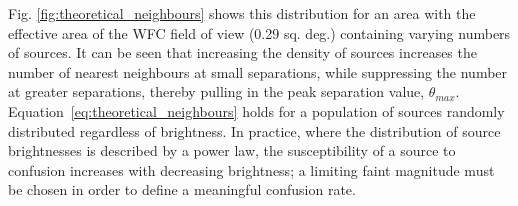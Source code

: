 \documentclass[a4paper,useAMS,usenatbib]{mn2e}
\begin{document}
Fig. \ref{fig:theoretical_neighbours} shows this distribution for an area with the effective area of the WFC field of 
view (0.29 sq. deg.) containing varying numbers of sources. It can be seen that increasing the density of sources 
increases the number of nearest neighbours at small separations, while suppressing the number at greater separations,
thereby pulling in the peak separation value, $\theta_{max}$.  Equation~\ref{eq:theoretical_neighbours} holds for a 
population of sources randomly 
distributed regardless of brightness. In practice, where the distribution of source brightnesses is described by a 
power law, the susceptibility of a source to confusion increases with decreasing brightness; a limiting faint magnitude 
must be chosen in order to define a meaningful confusion rate.



\end{document}
